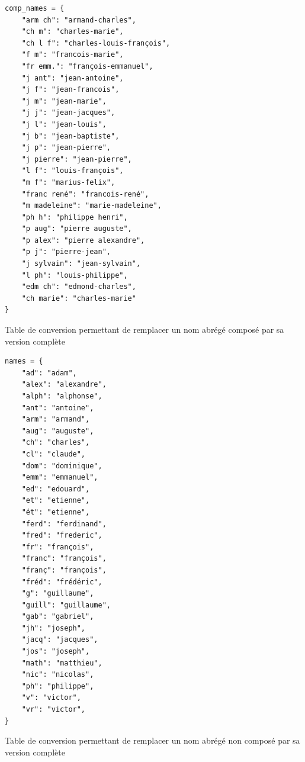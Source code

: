\begin{listing}[p]
	\begin{verbatim}
comp_names = {
	"arm ch": "armand-charles",
	"ch m": "charles-marie",
	"ch l f": "charles-louis-françois",
	"f m": "francois-marie",
	"fr emm.": "françois-emmanuel",
	"j ant": "jean-antoine",
	"j f": "jean-francois",
	"j m": "jean-marie",
	"j j": "jean-jacques",
	"j l": "jean-louis",
	"j b": "jean-baptiste",
	"j p": "jean-pierre",
	"j pierre": "jean-pierre",
	"l f": "louis-françois",
	"m f": "marius-felix",
	"franc rené": "francois-rené",
	"m madeleine": "marie-madeleine",
	"ph h": "philippe henri",
	"p aug": "pierre auguste",
	"p alex": "pierre alexandre",
	"p j": "pierre-jean",
	"j sylvain": "jean-sylvain",
	"l ph": "louis-philippe",
	"edm ch": "edmond-charles",
	"ch marie": "charles-marie"
}
	\end{verbatim}
	\caption{Table de conversion permettant de remplacer un nom abrégé composé par sa version complète}
	\label{appendix:namecomp}
\end{listing}

\begin{listing}[p]
	\begin{verbatim}
names = {
	"ad": "adam",
	"alex": "alexandre",
	"alph": "alphonse",
	"ant": "antoine",
	"arm": "armand",
	"aug": "auguste",
	"ch": "charles",
	"cl": "claude",
	"dom": "dominique",
	"emm": "emmanuel",
	"ed": "edouard",
	"et": "etienne",
	"ét": "etienne",
	"ferd": "ferdinand",
	"fred": "frederic",
	"fr": "françois",
	"franc": "françois",
	"franç": "françois",
	"fréd": "frédéric",
	"g": "guillaume",
	"guill": "guillaume",
	"gab": "gabriel",
	"jh": "joseph",
	"jacq": "jacques",
	"jos": "joseph",
	"math": "matthieu",
	"nic": "nicolas",
	"ph": "philippe",
	"v": "victor",
	"vr": "victor",
}
	\end{verbatim}
	\caption{Table de conversion permettant de remplacer un nom abrégé non composé par sa version complète}
	\label{appendix:namesimp}
\end{listing}

